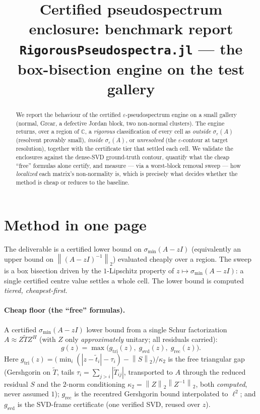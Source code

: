 \documentclass[11pt,a4paper]{article}
\title{\textbf{Certified pseudospectrum enclosure: benchmark report}\\[0.3em]
\large \texttt{RigorousPseudospectra.jl} --- the box-bisection engine on the test gallery}
\author{}
\date{}
\newcommand{\smin}{\sigma_{\min}}
\newcommand{\eps}{\varepsilon}
\newcommand{\C}{\mathbb{C}}
\newcommand{\norm}[1]{\left\|#1\right\|}
\begin{document}
\maketitle

\begin{abstract}
\noindent
We report the behaviour of the certified $\eps$-pseudospectrum engine on a small
gallery (normal, Grcar, a defective Jordan block, two non-normal clusters). The
engine returns, over a region of $\C$, a \emph{rigorous} classification of every
cell as \emph{outside} $\sigma_\eps(A)$ (resolvent provably small), \emph{inside}
$\sigma_\eps(A)$, or \emph{unresolved} (the $\eps$-contour at target resolution),
together with the certificate tier that settled each cell. We validate the
enclosures against the dense-SVD ground-truth contour, quantify what the cheap
``free'' formulas alone certify, and measure --- via a worst-block removal sweep
--- how \emph{localized} each matrix's non-normality is, which is precisely what
decides whether the method is cheap or reduces to the baseline.
\end{abstract}

\section{Method in one page}

The deliverable is a certified lower bound on $\smin(A-zI)$ (equivalently an upper
bound on $\norm{(A-zI)^{-1}}_2$) evaluated cheaply over a region. The sweep is a
box bisection driven by the $1$-Lipschitz property of $z\mapsto\smin(A-zI)$: a
single certified centre value settles a whole cell. The lower bound is computed
\emph{tiered, cheapest-first}.

\paragraph{Cheap floor (the ``free'' formulas).} A certified
$\smin(A-zI)$ lower bound from a single Schur factorization $A\approx Z\tilde T
Z^{H}$ (with $Z$ only \emph{approximately} unitary; all residuals carried):
\[
  g(z)=\max\bigl(g_{\mathrm{tri}}(z),\;g_{\mathrm{svd}}(z),\;g_{\mathrm{rec}}(z)\bigr).
\]
Here $g_{\mathrm{tri}}(z)=\bigl(\min_i(|z-\tilde t_i|-\tau_i)-\norm{S}_2\bigr)/\kappa_2$
is the free triangular gap (Gershgorin on $\tilde T$, tails $\tau_i=\sum_{j>i}|\tilde
T_{ij}|$, transported to $A$ through the reduced residual $S$ and the $2$-norm
conditioning $\kappa_2=\norm{Z}_2\norm{Z^{-1}}_2$, both \emph{computed}, never
assumed $1$); $g_{\mathrm{rec}}$ is the recentred Gershgorin bound interpolated to
$\ell^2$; and $g_{\mathrm{svd}}$ is the SVD-frame certificate (one verified SVD,
reused over $z$).
\end{document}
